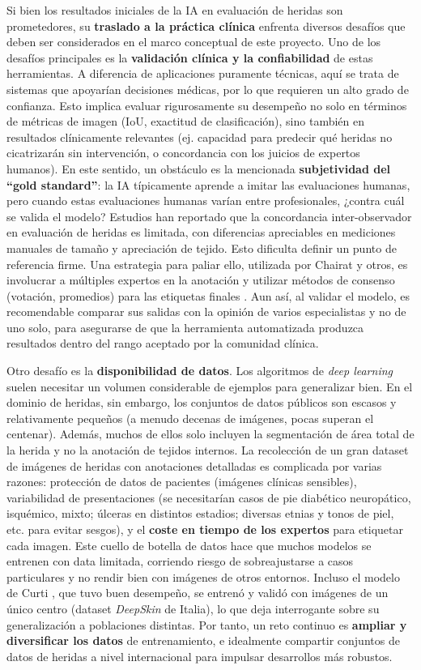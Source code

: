 Si bien los resultados iniciales de la IA en evaluación de heridas son prometedores, su \textbf{traslado a la práctica clínica} enfrenta diversos desafíos que deben ser considerados en el marco conceptual de este proyecto. Uno de los desafíos principales es la \textbf{validación clínica y la confiabilidad} de estas herramientas. A diferencia de aplicaciones puramente técnicas, aquí se trata de sistemas que apoyarían decisiones médicas, por lo que requieren un alto grado de confianza. Esto implica evaluar rigurosamente su desempeño no solo en términos de métricas de imagen (IoU, exactitud de clasificación), sino también en resultados clínicamente relevantes (ej. capacidad para predecir qué heridas no cicatrizarán sin intervención, o concordancia con los juicios de expertos humanos). En este sentido, un obstáculo es la mencionada \textbf{subjetividad del “gold standard”}: la IA típicamente aprende a imitar las evaluaciones humanas, pero cuando estas evaluaciones humanas varían entre profesionales, ¿contra cuál se valida el modelo? Estudios han reportado que la concordancia inter-observador en evaluación de heridas es limitada, con diferencias apreciables en mediciones manuales de tamaño y apreciación de tejido. Esto dificulta definir un punto de referencia firme. Una estrategia para paliar ello, utilizada por Chairat y otros, es involucrar a múltiples expertos en la anotación y utilizar métodos de consenso (votación, promedios) para las etiquetas finales \cite{healthcare11020273}. Aun así, al validar el modelo, es recomendable comparar sus salidas con la opinión de varios especialistas y no de uno solo, para asegurarse de que la herramienta automatizada produzca resultados dentro del rango aceptado por la comunidad clínica. 

Otro desafío es la \textbf{disponibilidad de datos}. Los algoritmos de \textit{deep learning} suelen necesitar un volumen considerable de ejemplos para generalizar bien. En el dominio de heridas, sin embargo, los conjuntos de datos públicos son escasos y relativamente pequeños (a menudo decenas de imágenes, pocas superan el centenar). Además, muchos de ellos solo incluyen la segmentación de área total de la herida y no la anotación de tejidos internos. La recolección de un gran dataset de imágenes de heridas con anotaciones detalladas es complicada por varias razones: protección de datos de pacientes (imágenes clínicas sensibles), variabilidad de presentaciones (se necesitarían casos de pie diabético neuropático, isquémico, mixto; úlceras en distintos estadios; diversas etnias y tonos de piel, etc. para evitar sesgos), y el \textbf{coste en tiempo de los expertos} para etiquetar cada imagen. Este cuello de botella de datos hace que muchos modelos se entrenen con data limitada, corriendo riesgo de sobreajustarse a casos particulares y no rendir bien con imágenes de otros entornos. Incluso el modelo de Curti \cite{Curti2024}, que tuvo buen desempeño, se entrenó y validó con imágenes de un único centro (dataset \textit{DeepSkin} de Italia), lo que deja interrogante sobre su generalización a poblaciones distintas. Por tanto, un reto continuo es \textbf{ampliar y diversificar los datos} de entrenamiento, e idealmente compartir conjuntos de datos de heridas a nivel internacional para impulsar desarrollos más robustos. 

